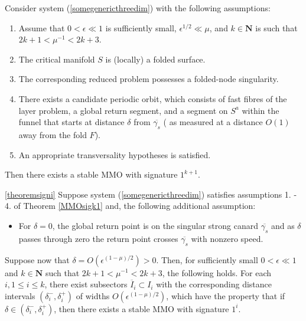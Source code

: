 \begin{theorem} \label{MMOsigk1}
Consider system (\ref{somegenericthreedim}) with the following assumptions:
\begin{enumerate}
\item Assume that $ 0 < \epsilon \ll 1$ is sufficiently small, $\epsilon^{1/2} \ll \mu$, and $k \in \mathbf{N}$ is such that $2k + 1 < \mu^{-1} < 2k + 3$.
\item The critical manifold $S$ is (locally) a folded surface.
\item The corresponding reduced problem possesses a folded-node singularity.
\item There exists a candidate periodic orbit, which consists of fast fibres of the layer problem, a global return segment, and a segment on $S^a$ within the funnel that starts at distance $\delta$ from $\overline{\gamma_s}$ ( as measured at a distance $O(1)$ away from the fold $F$).
\item An appropriate transversality hypotheses is satisfied.
\end{enumerate}
Then there exists a stable MMO with signature $1^{k+1}$.
\end{theorem}

\begin{theorem} \ref{theoremsigni}
Suppose system (\ref{somegenericthreedim}) satisfies assumptions 1. - 4. of Theorem \ref{MMOsigk1} and, the following additional assumption:
\begin{itemize}
\item For $\delta = 0$, the global return point is on the singular strong canard $\overline{\gamma_s}$ and as $\delta$ passes through zero the return point crosses $\overline{\gamma_s}$ with nonzero speed.
\end{itemize}
Suppose now that $\delta= O(\epsilon ^{(1-\mu)/2})>0$. Then, for sufficiently small $0 < \epsilon \ll 1$ and $k \in \mathbf{N}$ such that $2k+1 < \mu^{-1} < 2k+ 3$, the following holds.
For each $i, 1 \leq i \leq k$, there exist subsectors $\overline{I}_i \subset I_i$ with the corresponding distance intervals $(\delta_i^-, \delta_i^+)$ of widths $O(\epsilon^{(1-\mu)/2})$, which have the property that if $\delta \in (\delta_i^-, \delta_i^+)$, then there exists a stable MMO with signature $1^i$.
\end{theorem}


